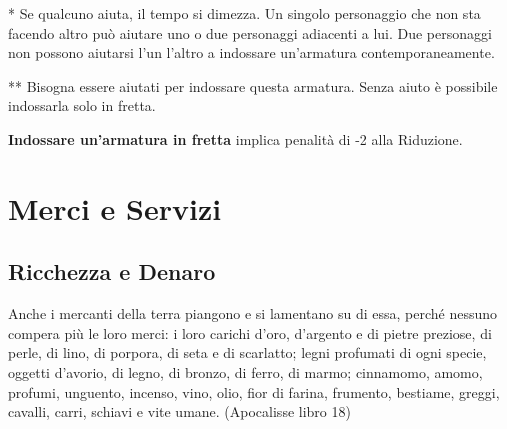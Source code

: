 \documentclass[12pt,a4paper,twoside,openany]{book}
\begin{document}
\bigskip

\begin{multicols}{2}

{*} Se qualcuno aiuta, il tempo si dimezza. Un singolo personaggio che non sta facendo altro può aiutare uno o due personaggi adiacenti a lui. Due personaggi non possono aiutarsi l'un l'altro a indossare un'armatura contemporaneamente.

{*}{*} Bisogna essere aiutati per indossare questa armatura. Senza aiuto è possibile indossarla solo in fretta.

\textbf{Indossare un'armatura in fretta} implica penalità di -2 alla Riduzione.


\end{multicols}

\pagebreak

\section{Merci e Servizi}


\subsection{Ricchezza e Denaro}


\begin{changemargin}{0.3cm}{0.3cm}\begin{enfasi}{
Anche i mercanti della terra piangono e si lamentano su di essa, perché nessuno compera più le loro merci: i loro carichi d’oro, d’argento e di pietre preziose, di perle, di lino, di porpora, di seta e di scarlatto; legni profumati di ogni specie, oggetti d’avorio, di legno, di bronzo, di ferro, di marmo; cinnamomo, amomo, profumi, unguento, incenso, vino, olio, fior di farina, frumento, bestiame, greggi, cavalli, carri, schiavi e vite umane. (Apocalisse libro 18)
}
\end{enfasi}\end{changemargin}\medskip
\end{document}
